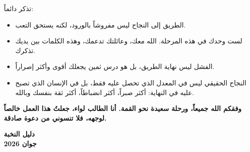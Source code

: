 \documentclass[12pt,a4paper]{book}
\newcommand{\importantAr}[1]{%
	\begin{important}
		\bfseries #1
	\end{important}
}
\begin{document}
	تذكر دائماً:
	\begin{itemize}
		\item الطريق إلى النجاح ليس مفروشاً بالورود، لكنه يستحق التعب.
		\item لست وحدك في هذه المرحلة. الله معك، وعائلتك تدعمك، وهذه الكلمات بين يديك تذكرك.
		\item الفشل ليس نهاية الطريق، بل هو درس ثمين يجعلك أقوى وأكثر إصراراً.
		\item النجاح الحقيقي ليس في المعدل الذي تحصل عليه فقط، بل في الإنسان الذي تصبح عليه في النهاية: أكثر صبراً، أكثر انضباطاً، أكثر ثقة بنفسك وبالله.
	\end{itemize}
	
	\importantAr{وفقكم الله جميعاً، ورحلة سعيدة نحو القمة. أنا الطالب لواء، جعلتُ هذا العمل خالصاً لوجهه، فلا تنسوني من دعوة صادقة.}
	\vspace{1cm}
	\begin{flushleft}
		\textbf{ دليل النخبة}\\
		\textbf{جوان 2026}
	\end{flushleft}
\end{document}
